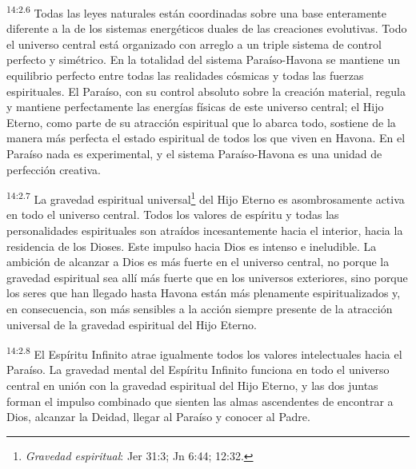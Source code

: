 \par
\textsuperscript{14:2.6} Todas las leyes naturales están coordinadas sobre una base enteramente diferente a la de los sistemas energéticos duales de las creaciones evolutivas. Todo el universo central está organizado con arreglo a un triple sistema de control perfecto y simétrico. En la totalidad del sistema Paraíso-Havona se mantiene un equilibrio perfecto entre todas las realidades cósmicas y todas las fuerzas espirituales. El Paraíso, con su control absoluto sobre la creación material, regula y mantiene perfectamente las energías físicas de este universo central; el Hijo Eterno, como parte de su atracción espiritual que lo abarca todo, sostiene de la manera más perfecta el estado espiritual de todos los que viven en Havona. En el Paraíso nada es experimental, y el sistema Paraíso-Havona es una unidad de perfección creativa.

\par
\textsuperscript{14:2.7} La gravedad espiritual universal\footnote{\textit{Gravedad espiritual}: Jer 31:3; Jn 6:44; 12:32.} del Hijo Eterno es asombrosamente activa en todo el universo central. Todos los valores de espíritu y todas las personalidades espirituales son atraídos incesantemente hacia el interior, hacia la residencia de los Dioses. Este impulso hacia Dios es intenso e ineludible. La ambición de alcanzar a Dios es más fuerte en el universo central, no porque la gravedad espiritual sea allí más fuerte que en los universos exteriores, sino porque los seres que han llegado hasta Havona están más plenamente espiritualizados y, en consecuencia, son más sensibles a la acción siempre presente de la atracción universal de la gravedad espiritual del Hijo Eterno.

\par
\textsuperscript{14:2.8} El Espíritu Infinito atrae igualmente todos los valores intelectuales hacia el Paraíso. La gravedad mental del Espíritu Infinito funciona en todo el universo central en unión con la gravedad espiritual del Hijo Eterno, y las dos juntas forman el impulso combinado que sienten las almas ascendentes de encontrar a Dios, alcanzar la Deidad, llegar al Paraíso y conocer al Padre.

